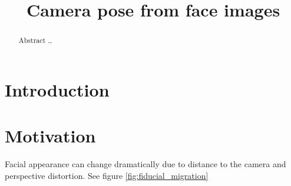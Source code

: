 \documentclass[runningheads]{llncs}
\begin{document}
\pagestyle{headings}

\mainmatter

\title{Camera pose from face images}


\maketitle

\begin{abstract}
Abstract
\dots
\end{abstract}

\section{Introduction}

\section{Motivation}
Facial appearance can change dramatically due to distance to the camera and perspective distortion.  See figure \ref{fig:fiducial_migration}
\end{document}
